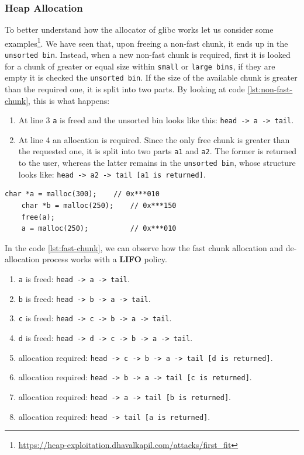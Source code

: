\documentclass{article}
\numberwithin{equation}{subsection}
\begin{document}
\subsubsection{Heap Allocation}
To better understand how the allocator of glibc works let us consider some examples\footnote{\href{https://heap-exploitation.dhavalkapil.com/attacks/first_fit}{https://heap-exploitation.dhavalkapil.com/attacks/first\_fit}}. We have seen that, upon freeing a non-fast chunk, it ends up in the \texttt{unsorted bin}. Instead, when a new non-fast chunk is required, first it is looked for a chunk of greater or equal size within \texttt{small} or \texttt{large bins}, if they are empty it is checked the \texttt{unsorted bin}. If the size of the available chunk is greater than the required one, it is split into two parts.\newline
\noindent
By looking at code \ref{lst:non-fast-chunk}, this is what happens:
\begin{enumerate}
    \item At line 3 \texttt{a} is freed and the unsorted bin looks like this: \texttt{head -> a -> tail}.
    \item At line 4 an allocation is required. Since the only free chunk is greater than the requested one, it is split into two parts \texttt{a1} and \texttt{a2}. The former is returned to the user, whereas the latter remains in the \texttt{unsorted bin}, whose structure looks like:\newline
    \texttt{head -> a2 -> tail [a1 is returned]}.
\end{enumerate}
\begin{minipage}{\textwidth}
\centering
    \lstset{style=cstyle}
    \begin{lstlisting}[caption={Non-fast chunk allocation and de-allocation.},captionpos=b,label={lst:non-fast-chunk}]
    char *a = malloc(300);    // 0x***010
    char *b = malloc(250);    // 0x***150
    free(a);
    a = malloc(250);          // 0x***010
\end{lstlisting}
\end{minipage}
\noindent
In the code \ref{lst:fast-chunk}, we can observe how the fast chunk allocation and de-allocation process works with a \textbf{LIFO} policy.
\begin{enumerate}
    \item \texttt{a} is freed: \texttt{head -> a -> tail}.
    \item \texttt{b} is freed: \texttt{head -> b -> a -> tail}.
    \item \texttt{c} is freed: \texttt{head -> c ->  b -> a -> tail}.
    \item \texttt{d} is freed: \texttt{head -> d -> c ->  b -> a -> tail}.
    \item allocation required: \texttt{head -> c ->  b -> a -> tail [d is returned]}.
    \item allocation required: \texttt{head ->  b -> a -> tail [c is returned]}.
    \item allocation required: \texttt{head -> a -> tail [b is returned]}.
    \item allocation required: \texttt{head -> tail [a is returned]}.
\end{enumerate}
\end{document}
